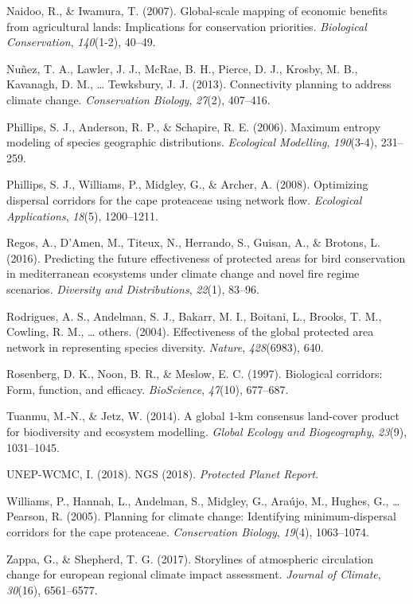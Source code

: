 \documentclass[]{article}
\begin{document}
\leavevmode\hypertarget{ref-naidoo2007global}{}%
Naidoo, R., \& Iwamura, T. (2007). Global-scale mapping of economic benefits from agricultural lands: Implications for conservation priorities. \emph{Biological Conservation}, \emph{140}(1-2), 40--49.

\leavevmode\hypertarget{ref-nunez2013connectivity}{}%
Nuñez, T. A., Lawler, J. J., McRae, B. H., Pierce, D. J., Krosby, M. B., Kavanagh, D. M., \ldots{} Tewksbury, J. J. (2013). Connectivity planning to address climate change. \emph{Conservation Biology}, \emph{27}(2), 407--416.

\leavevmode\hypertarget{ref-phillips2006maximum}{}%
Phillips, S. J., Anderson, R. P., \& Schapire, R. E. (2006). Maximum entropy modeling of species geographic distributions. \emph{Ecological Modelling}, \emph{190}(3-4), 231--259.

\leavevmode\hypertarget{ref-phillips2008optimizing}{}%
Phillips, S. J., Williams, P., Midgley, G., \& Archer, A. (2008). Optimizing dispersal corridors for the cape proteaceae using network flow. \emph{Ecological Applications}, \emph{18}(5), 1200--1211.

\leavevmode\hypertarget{ref-regos2016predicting}{}%
Regos, A., D'Amen, M., Titeux, N., Herrando, S., Guisan, A., \& Brotons, L. (2016). Predicting the future effectiveness of protected areas for bird conservation in mediterranean ecosystems under climate change and novel fire regime scenarios. \emph{Diversity and Distributions}, \emph{22}(1), 83--96.

\leavevmode\hypertarget{ref-rodrigues2004effectiveness}{}%
Rodrigues, A. S., Andelman, S. J., Bakarr, M. I., Boitani, L., Brooks, T. M., Cowling, R. M., \ldots{} others. (2004). Effectiveness of the global protected area network in representing species diversity. \emph{Nature}, \emph{428}(6983), 640.

\leavevmode\hypertarget{ref-rosenberg1997biological}{}%
Rosenberg, D. K., Noon, B. R., \& Meslow, E. C. (1997). Biological corridors: Form, function, and efficacy. \emph{BioScience}, \emph{47}(10), 677--687.

\leavevmode\hypertarget{ref-tuanmu2014global}{}%
Tuanmu, M.-N., \& Jetz, W. (2014). A global 1-km consensus land-cover product for biodiversity and ecosystem modelling. \emph{Global Ecology and Biogeography}, \emph{23}(9), 1031--1045.

\leavevmode\hypertarget{ref-unep2018ngs}{}%
UNEP-WCMC, I. (2018). NGS (2018). \emph{Protected Planet Report}.

\leavevmode\hypertarget{ref-williams2005planning}{}%
Williams, P., Hannah, L., Andelman, S., Midgley, G., Araújo, M., Hughes, G., \ldots{} Pearson, R. (2005). Planning for climate change: Identifying minimum-dispersal corridors for the cape proteaceae. \emph{Conservation Biology}, \emph{19}(4), 1063--1074.

\leavevmode\hypertarget{ref-zappa2017storylines}{}%
Zappa, G., \& Shepherd, T. G. (2017). Storylines of atmospheric circulation change for european regional climate impact assessment. \emph{Journal of Climate}, \emph{30}(16), 6561--6577.
\end{document}
